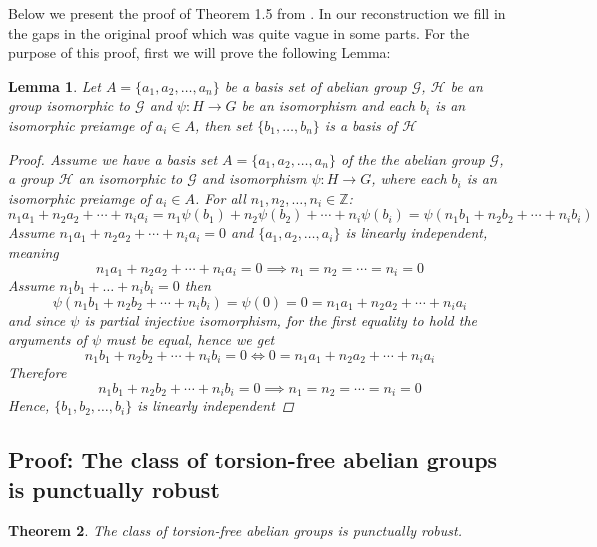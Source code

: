 \documentclass{pracalicmgr2025}
\theoremstyle{plain}            %
\newtheorem{theorem}{Theorem}[chapter]
\newtheorem{lemma}[theorem]{Lemma}
\theoremstyle{remark}           %
\theoremstyle{definition}       %
\begin{document}
Below we present the proof of Theorem 1.5 from \cite{3}. In our reconstruction we fill in the gaps in the original proof which was quite vague in some parts. For the purpose of this proof, first we will prove the following Lemma:
\begin{lemma} \label{basis lemma}
    Let $A = \{a_1,a_2,\dots,a_n\}$ be a basis set of abelian group $\mathcal{G}$, $\mathcal{H}$ be an group isomorphic to $\mathcal{G}$ and $\psi: H \to G$ be an isomorphism and each $b_i$ is an isomorphic preiamge of $a_i \in A $, then set $\{b_1,\dots,b_n\}$ is a basis of $\mathcal{H}$
    \begin{proof}
     Assume we have a basis set $A = \{a_1,a_2,\dots,a_n\}$ of the the abelian group $\mathcal{G}$, a group $\mathcal{H}$ an isomorphic to $\mathcal{G}$ and isomorphism $\psi: H \to G$, where each $b_i$ is an isomorphic preiamge of $a_i \in A $. For all $n_1,n_2,\dots,n_i \in \mathbb{Z}$:
        $$n_1a_1 + n_2a_2+\cdots+n_ia_i = n_1\psi(b_1) + n_2\psi(b_2)+\cdots+n_i\psi(b_i) = \psi(n_1b_1 + n_2b_2+\cdots+n_ib_i) $$
         Assume $n_1a_1 + n_2a_2+\cdots+n_ia_i = 0$ and $\{a_1,a_2,\dots,a_i\}$ is linearly independent, meaning
        $$n_1a_1 + n_2a_2+\cdots+n_ia_i = 0 \implies n_1=n_2=\cdots = n_i = 0$$
        Assume $n_1b_1 + \dots + n_ib_i = 0$ then
        $$\psi(n_1b_1 + n_2b_2+\cdots+n_ib_i) = \psi(0) = 0 = n_1a_1 + n_2a_2+\cdots+n_ia_i  $$
        and since $\psi$ is partial injective isomorphism, for the first equality to hold the arguments of $\psi$ must be equal, hence we get
        $$n_1b_1 + n_2b_2+\cdots+n_ib_i = 0 \iff 0 = n_1a_1 + n_2a_2+\cdots+n_ia_i $$
        Therefore
        $$n_1b_1 + n_2b_2+\cdots+n_ib_i = 0 \implies n_1=n_2=\cdots = n_i = 0$$
        Hence, $\{b_1,b_2,\dots,b_i \}$ is linearly independent
    \end{proof}
\end{lemma}
\subsection{Proof: The class of torsion-free abelian groups is punctually robust}
\begin{theorem} \label{theorem torsion-free}
The class of torsion-free abelian groups is punctually robust.
\end{theorem}
\end{document}
